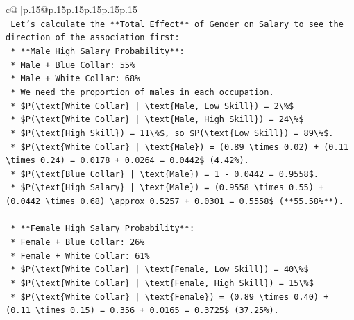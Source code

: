 \documentclass{article}
\begin{document}
{\begin{supertabular}{c@{$\;$}|p{.15\linewidth}@{}p{.15\linewidth}p{.15\linewidth}p{.15\linewidth}p{.15\linewidth}p{.15\linewidth}}
{{{\\ 
\texttt{    Let's calculate the **Total Effect** of Gender on Salary to see the direction of the association first:} \\
\texttt{    *   **Male High Salary Probability**:} \\
\texttt{        *   Male + Blue Collar: 55\%} \\
\texttt{        *   Male + White Collar: 68\%} \\
\texttt{        *   We need the proportion of males in each occupation.} \\
\texttt{        *   \$P(\textbackslash{}text\{White Collar\} | \textbackslash{}text\{Male, Low Skill\}) = 2\textbackslash{}\%\$} \\
\texttt{        *   \$P(\textbackslash{}text\{White Collar\} | \textbackslash{}text\{Male, High Skill\}) = 24\textbackslash{}\%\$} \\
\texttt{        *   \$P(\textbackslash{}text\{High Skill\}) = 11\textbackslash{}\%\$, so \$P(\textbackslash{}text\{Low Skill\}) = 89\textbackslash{}\%\$.} \\
\texttt{        *   \$P(\textbackslash{}text\{White Collar\} | \textbackslash{}text\{Male\}) = (0.89 \textbackslash{}times 0.02) + (0.11 \textbackslash{}times 0.24) = 0.0178 + 0.0264 = 0.0442\$ (4.42\%).} \\
\texttt{        *   \$P(\textbackslash{}text\{Blue Collar\} | \textbackslash{}text\{Male\}) = 1 {-} 0.0442 = 0.9558\$.} \\
\texttt{        *   \$P(\textbackslash{}text\{High Salary\} | \textbackslash{}text\{Male\}) = (0.9558 \textbackslash{}times 0.55) + (0.0442 \textbackslash{}times 0.68) \textbackslash{}approx 0.5257 + 0.0301 = 0.5558\$ (**55.58\%**).} \\
\\ 
\texttt{    *   **Female High Salary Probability**:} \\
\texttt{        *   Female + Blue Collar: 26\%} \\
\texttt{        *   Female + White Collar: 61\%} \\
\texttt{        *   \$P(\textbackslash{}text\{White Collar\} | \textbackslash{}text\{Female, Low Skill\}) = 40\textbackslash{}\%\$} \\
\texttt{        *   \$P(\textbackslash{}text\{White Collar\} | \textbackslash{}text\{Female, High Skill\}) = 15\textbackslash{}\%\$} \\
\texttt{        *   \$P(\textbackslash{}text\{White Collar\} | \textbackslash{}text\{Female\}) = (0.89 \textbackslash{}times 0.40) + (0.11 \textbackslash{}times 0.15) = 0.356 + 0.0165 = 0.3725\$ (37.25\%).} \\
}}}
\end{supertabular}}
\end{document}
